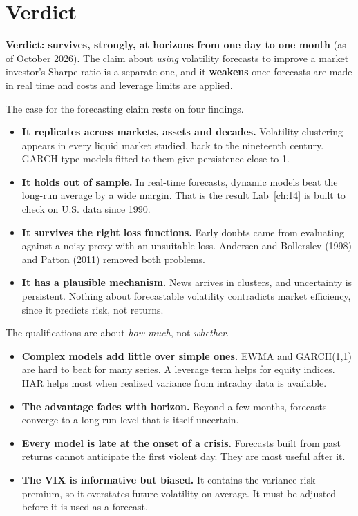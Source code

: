 \section{Verdict}
\label{sec:14-verdict}

\begin{callout}
\textbf{Verdict: survives, strongly, at horizons from one day to one month} (as of October 2026). The claim about \emph{using} volatility forecasts to improve a market investor's Sharpe ratio is a separate one, and it \textbf{weakens} once forecasts are made in real time and costs and leverage limits are applied.
\end{callout}

The case for the forecasting claim rests on four findings.

\begin{itemize}
  \item \textbf{It replicates across markets, assets and decades.} Volatility clustering appears in every liquid market studied, back to the nineteenth century. GARCH-type models fitted to them give persistence close to 1.
  \item \textbf{It holds out of sample.} In real-time forecasts, dynamic models beat the long-run average by a wide margin. That is the result Lab~\ref{ch:14} is built to check on U.S. data since 1990.
  \item \textbf{It survives the right loss functions.} Early doubts came from evaluating against a noisy proxy with an unsuitable loss. Andersen and Bollerslev (1998) and Patton (2011) removed both problems.
  \item \textbf{It has a plausible mechanism.} News arrives in clusters, and uncertainty is persistent. Nothing about forecastable volatility contradicts market efficiency, since it predicts risk, not returns.
\end{itemize}

The qualifications are about \emph{how much}, not \emph{whether}.

\begin{itemize}
  \item \textbf{Complex models add little over simple ones.} EWMA and GARCH(1,1) are hard to beat for many series. A leverage term helps for equity indices. HAR helps most when realized variance from intraday data is available.
  \item \textbf{The advantage fades with horizon.} Beyond a few months, forecasts converge to a long-run level that is itself uncertain.
  \item \textbf{Every model is late at the onset of a crisis.} Forecasts built from past returns cannot anticipate the first violent day. They are most useful after it.
  \item \textbf{The VIX is informative but biased.} It contains the variance risk premium, so it overstates future volatility on average. It must be adjusted before it is used as a forecast.
\end{itemize}

